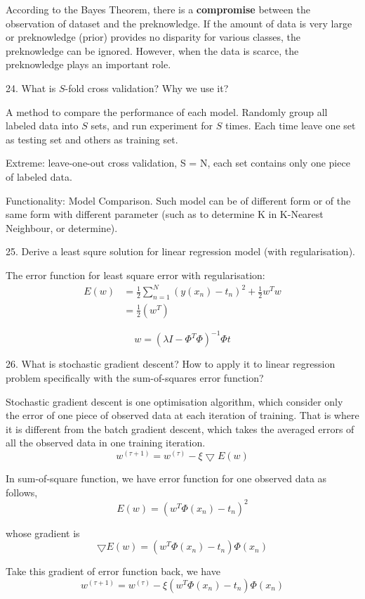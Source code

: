 \documentclass[11pt,a4paper]{article}
\newcommand{\BOLD}[1]{\textbf{#1}}
\newcommand{\half}{\frac{1}{2}}
\begin{document}
    According to the Bayes Theorem, there is a \BOLD{compromise} between the observation of dataset and the preknowledge. If the amount of data is very large or preknowledge (prior) provides no disparity for various classes, the preknowledge can be ignored. However, when the data is scarce, the preknowledge plays an important role.

24. What is $S$-fold cross validation? Why we use it?
    
    A method to compare the performance of each model. Randomly group all labeled data into $S$ sets, and run experiment for $S$ times. Each time leave one set as testing set and others as training set. 

    Extreme: leave-one-out cross validation, S = N, each set contains only one piece of labeled data.

    Functionality: Model Comparison. Such model can be of different form or of the same form with different parameter (such as to determine K in K-Nearest Neighbour, or determine).

25. Derive a least squre solution for linear regression model (with regularisation).
    
    The error function for least square error with regularisation:
    \begin{align}
        E(w) &= \half \sum_{n=1}^{N} (y(x_n) - t_n)^2 + \half w^T w \\
             &= \half ( w^T )
    \end{align}

    $$
    w = (\lambda I - \Phi^T \Phi)^{-1} \Phi t
    $$

26. What is stochastic gradient descent? How to apply it to linear regression problem specifically with the sum-of-squares error function?

    Stochastic gradient descent is one optimisation algorithm, which consider only the error of one piece of observed data at each iteration of training. That is where it is different from the batch gradient descent, which takes the averaged errors of all the observed data in one training iteration.
    $$ w^{(\tau+1)} = w^{(\tau)} - \xi \bigtriangledown E(w) $$

    In sum-of-square function, we have error function for one observed data as follows,
    $$ E(w) = ( w^T \Phi(x_n) - t_n)^2 $$
    
    whose gradient is 
    $$ \bigtriangledown E(w) = (w^T \Phi(x_n) - t_n) \Phi(x_n)$$
    
    Take this gradient of error function back, we have
    $$ w^{(\tau+1)} = w^{(\tau)} - \xi (w^T \Phi(x_n) - t_n) \Phi(x_n) $$
\end{document}

